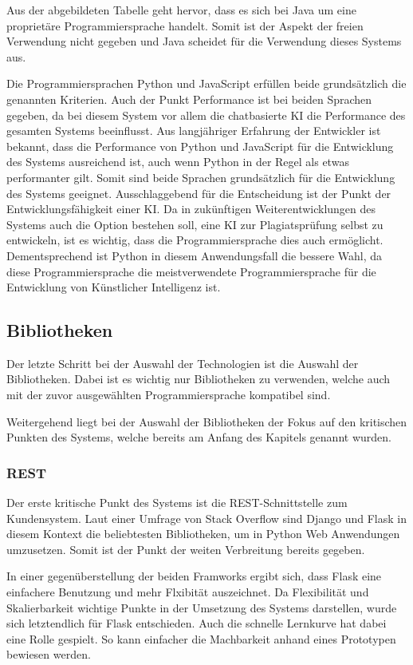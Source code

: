 Aus der abgebildeten Tabelle geht hervor, dass es sich bei Java um eine proprietäre Programmiersprache handelt.
Somit ist der Aspekt der freien Verwendung nicht gegeben und Java scheidet für die Verwendung dieses Systems aus.

Die Programmiersprachen Python und JavaScript erfüllen beide grundsätzlich die genannten Kriterien.
Auch der Punkt Performance ist bei beiden Sprachen gegeben, da bei diesem System
vor allem die chatbasierte KI die Performance des gesamten Systems beeinflusst.
Aus langjähriger Erfahrung der Entwickler ist bekannt, dass die
Performance von Python und JavaScript für die Entwicklung des Systems ausreichend ist,
auch wenn Python in der Regel als etwas performanter gilt.
Somit sind beide Sprachen grundsätzlich für die Entwicklung des Systems geeignet.
Ausschlaggebend für die Entscheidung ist der Punkt der Entwicklungsfähigkeit einer KI.
Da in zukünftigen Weiterentwicklungen des Systems auch die Option bestehen soll, eine KI zur Plagiatsprüfung selbst zu entwickeln,
ist es wichtig, dass die Programmiersprache dies auch ermöglicht.
Dementsprechend ist Python in diesem Anwendungsfall die bessere Wahl, da diese Programmiersprache
die meistverwendete Programmiersprache für die Entwicklung von Künstlicher Intelligenz ist.

\subsection{Bibliotheken}\label{subsec:bibliotheken}
Der letzte Schritt bei der Auswahl der Technologien ist die Auswahl der Bibliotheken.
Dabei ist es wichtig nur Bibliotheken zu verwenden, welche auch mit der zuvor ausgewählten Programmiersprache kompatibel sind.

Weitergehend liegt bei der Auswahl der Bibliotheken der Fokus auf den kritischen
Punkten des Systems, welche bereits am Anfang des Kapitels genannt wurden.

\subsubsection{REST}\label{subsubsec:rest}
Der erste kritische Punkt des Systems ist die REST-Schnittstelle zum Kundensystem.
Laut einer Umfrage von Stack Overflow sind Django und Flask in diesem Kontext die beliebtesten
Bibliotheken, um in Python Web Anwendungen umzusetzen\autocite{webframeworks}.
Somit ist der Punkt der weiten Verbreitung bereits gegeben.

In einer gegenüberstellung der beiden Framworks ergibt sich, dass Flask eine einfachere
Benutzung und mehr Flxibität auszeichnet\autocite{flaskdjango}.
Da Flexibilität und Skalierbarkeit wichtige Punkte in der Umsetzung des Systems darstellen,
wurde sich letztendlich für Flask entschieden.
Auch die schnelle Lernkurve hat dabei eine Rolle gespielt.
So kann einfacher die Machbarkeit anhand eines Prototypen bewiesen werden.


